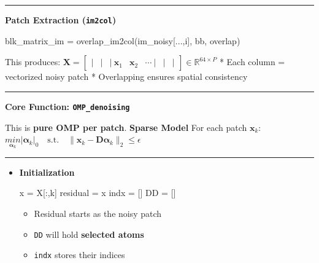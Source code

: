 \documentclass[11pt]{article}
\providecommand{\tightlist}{%
      \setlength{\itemsep}{0pt}\setlength{\parskip}{0pt}}
\newenvironment{Shaded}{}{}
\newcommand{\NormalTok}[1]{{#1}}
\newcommand{\OperatorTok}[1]{\textcolor[rgb]{0.40,0.40,0.40}{{#1}}}
\begin{document}
\begin{center}\rule{0.5\linewidth}{0.5pt}\end{center}

\textbf{Patch Extraction (\texttt{im2col})}

\begin{Shaded}
\begin{Highlighting}[]
\NormalTok{blk\_matrix\_im }\OperatorTok{=}\NormalTok{ overlap\_im2col(im\_noisy[...,i], bb, overlap)}
\end{Highlighting}
\end{Shaded}

This produces:
\(\mathbf{X} = \begin{bmatrix} | & | & | \ \mathbf{x}_1 & \mathbf{x}_2 & \cdots \ | & | & | \end{bmatrix} \in \mathbb{R}^{64 \times P}\)
* Each column = vectorized noisy patch * Overlapping ensures spatial
consistency

\begin{center}\rule{0.5\linewidth}{0.5pt}\end{center}

\textbf{Core Function: \texttt{OMP\_denoising}}

This is \textbf{pure OMP per patch}. \textbf{Sparse Model} For each
patch \(\mathbf{x}_k\):
\(\underset{\boldsymbol{\alpha}_k}{min} |\boldsymbol{\alpha}_k|_0 \quad \text{s.t.} \quad \|\mathbf{x}_k - \mathbf{D}\boldsymbol{\alpha}_k\|_2 \le \epsilon\)

\begin{center}\rule{0.5\linewidth}{0.5pt}\end{center}

\begin{itemize}
\item
  \textbf{Initialization}

\begin{Shaded}
\begin{Highlighting}[]
\NormalTok{x }\OperatorTok{=}\NormalTok{ X[:,k]}
\NormalTok{residual }\OperatorTok{=}\NormalTok{ x}
\NormalTok{indx }\OperatorTok{=}\NormalTok{ []}
\NormalTok{DD }\OperatorTok{=}\NormalTok{ []}
\end{Highlighting}
\end{Shaded}

  \begin{itemize}
  \tightlist
  \item
    Residual starts as the noisy patch
  \item
    \texttt{DD} will hold \textbf{selected atoms}
  \item
    \texttt{indx} stores their indices
  \end{itemize}
\end{itemize}
\end{document}
